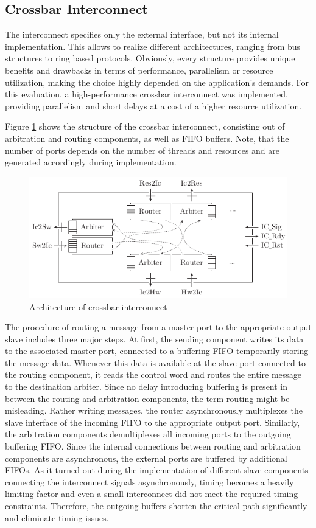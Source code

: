 \subsection{Crossbar Interconnect}
The interconnect specifies only the external interface, but not its internal
implementation. This allows to realize different architectures, ranging from
bus structures to ring based protocols. Obviously, every structure provides
unique benefits and drawbacks in terms of performance, parallelism or resource
utilization, making the choice highly depended on the application's demands.
For this evaluation, a high-performance crossbar interconnect was implemented,
providing parallelism and short delays at a cost of a higher resource
utilization.

Figure \ref{fig:crossbar} shows the structure of the crossbar interconnect,
consisting out of arbitration and routing components, as well as \ac{FIFO}
buffers. Note, that the number of ports depends on the number of threads and
resources and are generated accordingly during implementation.
\begin{figure}[tb]
	\centering
	\includegraphics{../figures/crossbar}
	\caption{Architecture of crossbar interconnect}
	\label{fig:crossbar}
\end{figure}
The procedure of routing a message from a master port to the appropriate
output slave includes three major steps. At first, the sending component
writes its data to the associated master port, connected to a buffering
\ac{FIFO} temporarily storing the message data. Whenever this data is
available at the slave port connected to the routing component, it reads the
control word and routes the entire message to the destination arbiter. Since
no delay introducing buffering is present in between the routing and
arbitration components, the term routing might be misleading. Rather writing
messages, the router asynchronously multiplexes the slave interface of the
incoming \ac{FIFO} to the appropriate output port. Similarly, the arbitration
components demultiplexes all incoming ports to the outgoing buffering
\ac{FIFO}. Since the internal connections between routing and arbitration
components are asynchronous, the external ports are buffered by additional
\acp{FIFO}. As it turned out during the implementation of different slave
components connecting the interconnect signals asynchronously, timing becomes
a heavily limiting factor and even a small interconnect did not meet the
required timing constraints. Therefore, the outgoing buffers shorten the
critical path significantly and eliminate timing issues.

